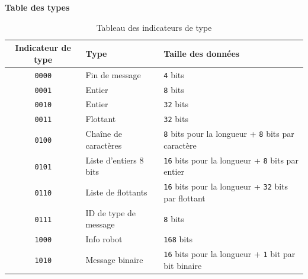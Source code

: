 \documentclass[aspectratio=169,10pt]{beamer}
\begin{document}
\begin{frame}{\textbf{Table des types}}
    \begin{table}[H]
		\centering
		\begin{tabular}{c l l}
			\hline
			\textbf{Indicateur de type} & \textbf{Type} & \textbf{Taille des données}\\
			\hline
			\texttt{0000} & Fin de message & \texttt{4} bits\\
			\texttt{0001} & Entier & \texttt{8} bits\\
			\texttt{0010} & Entier & \texttt{32} bits\\
			\texttt{0011} & Flottant & \texttt{32} bits\\
			\texttt{0100} & Chaîne de caractères & \texttt{8} bits pour la longueur + \texttt{8} bits par caractère\\
			\texttt{0101} & Liste d'entiers 8 bits & \texttt{16} bits pour la longueur + \texttt{8} bits par entier\\
			\texttt{0110} & Liste de flottants & \texttt{16} bits pour la longueur + \texttt{32} bits par flottant\\
			\texttt{0111} & ID de type de message & \texttt{8} bits\\
			\texttt{1000} & Info robot & \texttt{168} bits\\
			\texttt{1010} & Message binaire & \texttt{16} bits pour la longueur + \texttt{1} bit par bit binaire\\
			\hline
		\end{tabular}
		\caption{Tableau des indicateurs de type}
	\end{table}
\end{frame}
\end{document}

